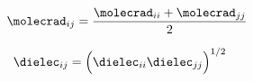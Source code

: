 \begin{bigmdframed}

    
\begin{listone}
    
    \item $\molecrad_{ij} = \dfrac{\molecrad_{ii}+\molecrad_{jj}}{2}$
        
    \item ~$\dielec_{ij} = \Big(\dielec_{ii}\dielec_{jj}\Big)^{1/2} $
    
\end{listone}
 
\end{bigmdframed}